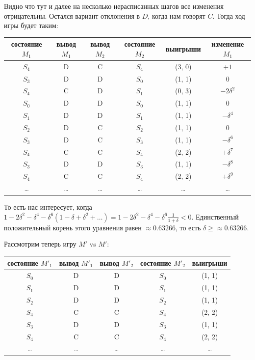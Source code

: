 \documentclass{article}
\theoremstyle{definition}
\theoremstyle{remark}
\renewcommand{\ge}{\geqslant}
\begin{document}
Видно что тут и далее на несколько нерасписанных шагов все изменения отрицательны. Остался вариант
отклонения в $D$, когда нам говорят $C$. Тогда ход игры будет таким:
\begin{center}
	\begin{tabular}{|c|c|c|c|c|c|}
		\hline
		состояние $M_1$ & вывод $M_1$ & вывод $M_2$ & состояние $M_2$ & выигрыши & изменение $M_1$ \\
		\hline
		$S_4$ & D & C & $S_4$ & (3, 0) & $+1$\\
		\hline
		$S_3$ & D & D & $S_0$ & (1, 1) & $0$\\
		\hline
		$S_4$ & C & D & $S_1$ & (0, 3) & $-2\delta^2$\\
		\hline
		$S_0$ & D & D & $S_0$ & (1, 1) & $0$\\
		\hline
		$S_1$ & D & D & $S_1$ & (1, 1) & $-\delta^4$\\
		\hline
		$S_2$ & D & C & $S_2$ & (1, 1) & $0$\\
		\hline
		$S_3$ & D & C & $S_3$ & (1, 1) & $-\delta^6$\\
		\hline
		$S_4$ & C & C & $S_4$ & (2, 2) & $+\delta^7$\\
		\hline
		$S_3$ & D & D & $S_3$ & (1, 1) & $-\delta^8$\\
		\hline
		$S_4$ & C & C & $S_4$ & (2, 2) & $+\delta^9$\\
		\hline
		\ldots & \ldots & \ldots & \ldots & \ldots & \ldots \\
		\hline
	\end{tabular}
\end{center}

То есть нас интересует, когда $1 - 2\delta^2 - \delta^4 - \delta^6(1 - \delta + \delta^2 + \ldots) =
1 - 2\delta^2 - \delta^4 - \delta^6 \frac{1}{1 + \delta} < 0$. Единственный положительный корень
этого уравнения равен $\approx 0.63266$, то есть $\delta \ge \approx 0.63266$.

Рассмотрим теперь игру $M'$ vs $M'$:
\begin{center}
	\begin{tabular}{|c|c|c|c|c|}
		\hline
		состояние $M'_1$ & вывод $M'_1$ & вывод $M'_2$ & состояние $M'_2$ & выигрыши \\
		\hline
		$S_0$ & D & D & $S_0$ & (1, 1) \\
		\hline
		$S_1$ & D & D & $S_1$ & (1, 1) \\
		\hline
		$S_2$ & D & D & $S_2$ & (1, 1) \\
		\hline
		$S_4$ & C & C & $S_4$ & (2, 2) \\
		\hline
		$S_3$ & D & D & $S_3$ & (1, 1) \\
		\hline
		$S_4$ & C & C & $S_4$ & (2, 2) \\
		\hline
		\ldots & \ldots & \ldots & \ldots & \ldots \\
		\hline
	\end{tabular}
\end{center}
\end{document}
